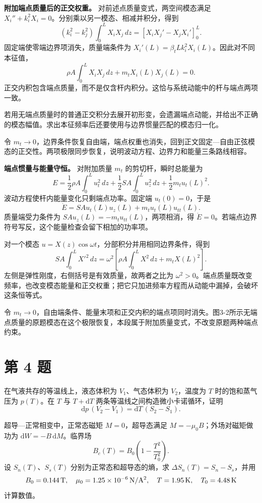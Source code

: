 \documentclass[12pt,a4paper,UTF8]{ctexart}
\begin{document}
\textbf{附加端点质量后的正交权重。} 对前述点质量变式，两空间模态满足
\(X_i''+k_i^2X_i=0\)。分别乘以另一模态、相减并积分，得到 \[
(k_i^2-k_j^2)\int_0^L X_iX_j\,dz
=[X_iX_j'-X_jX_i']_0^L.
\] 固定端使零端边界项消失，质量端条件为
\(X_i'(L)=\beta_tLk_i^2X_i(L)\)。因此对不同本征值， \[
\rho A\int_0^L X_iX_j\,dz+m_tX_i(L)X_j(L)=0.
\]
正交内积包含端点质量，而不是仅含杆内积分。这恰与系统动能中的杆与端点两项一致。

若用无端点质量时的普通正交积分去展开初形变，会遗漏端点动能，并给出不正确的模态幅值。求出本征频率后还要使用与边界惯量匹配的模态归一化。

令
\(m_t\to0\)，边界条件恢复自由端，端点权重也消失，回到正文固定---自由正弦模态的正交性。两项极限同步恢复，说明波动方程、边界力和能量三条路线相容。

\textbf{端点惯量与能量守恒。} 对附加质量 \(m_t\) 的剪切杆，瞬时总能量为
\[
E=\frac12\rho A\int_0^L u_t^2\,dz
+\frac12SA\int_0^L u_z^2\,dz
+\frac12m_tu_t(L)^2.
\] 波动方程使杆内能量变化只剩端点功率。固定端 \(u_t(0)=0\)，于是 \[
\dot E=SAu_t(L)u_z(L)+m_tu_t(L)u_{tt}(L).
\] 质量端受力条件为 \(SAu_z(L)=-m_tu_{tt}(L)\)，两项相消，得
\(\dot E=0\)。若端点边界符号写反，这个能量检查会留下相加的功率项。

对一个模态 \(u=X(z)\cos\omega t\)，分部积分并用相同边界条件，得到 \[
SA\int_0^L X'^2\,dz
=\omega^2\left[\rho A\int_0^L X^2\,dz+m_tX(L)^2\right].
\] 左侧是弹性刚度，右侧括号是有效质量，故两者之比为
\(\omega^2>0\)。端点质量既改变频率，也改变模态能量和正交权重；把它只加进频率方程而从动能中漏掉，会破坏这条恒等式。

令
\(m_t\to0\)，自由端条件、能量末项和正交内积的端点项同时消失。图3-2所示无端点质量的原题模态在这个极限恢复，本段属于附加质量变式，不改变原题两种端点约束。

\newpage

\section{第 4 题}\label{ux7b2c-4-ux9898}

在气液共存的等温线上，液态体积为 \(V_1\)、气态体积为 \(V_2\)，温度为
\(T\) 时的饱和蒸气压为 \(p(T)\)。在 \(T\) 与 \(T+\mathrm dT\)
两条等温线之间构造微小卡诺循环，证明 \[
\mathrm dp\,(V_2-V_1)=\mathrm dT\,(S_2-S_1).
\]

超导---正常相变中，正常态磁矩 \(M=0\)，超导态满足
\(M=-\mu_0B\)；外场对磁矩做功为 \(\mathrm dW=-B\,\mathrm dM\)。临界场 \[
B_c(T)=B_0\left(1-\frac{T^2}{T_0^2}\right).
\] 设 \(S_n(T)\)、\(S_s(T)\) 分别为正常态和超导态的熵，求
\(\Delta S_n(T)=S_n-S_s\)，并用 \[
B_0=0.144{\rm\,T},\quad
\mu_0=1.25\times10^{-6}{\rm\,N/A^2},\quad
T=1.95{\rm\,K},\quad T_0=4.48{\rm\,K}
\] 计算数值。
\end{document}
